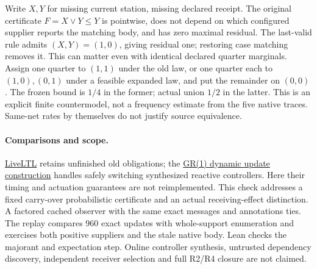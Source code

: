 \documentclass[11pt]{article}
\begin{document}
Write \(X,Y\) for missing current station, missing declared
receipt. The original certificate \(F=X\vee Y\le Y\) is
pointwise, does not depend on which configured supplier
reports the matching body, and has zero maximal residual.
The last-valid rule admits \((X,Y)=(1,0)\), giving residual
one; restoring case matching removes it. This can matter
even with identical declared quarter marginals. Assign
one quarter to \((1,1)\) under the old law, or one quarter
each to \((1,0),(0,1)\) under a feasible expanded law,
and put the remainder on \((0,0)\). The frozen bound is
\(1/4\) in the former; actual union \(1/2\) in the latter.
This is an explicit finite countermodel, not a frequency
estimate from the five native traces. Same-net rates by
themselves do not justify source equivalence.

\paragraph{Comparisons and scope.}
\href{https://arxiv.org/abs/2107.01136}{LiveLTL}
retains unfinished old obligations; the
\href{https://conf.researchr.org/details/icse-2022/icse-2022-papers/18/Dynamic-Update-for-Synthesized-GR-1-Controllers}{GR(1)
dynamic update construction} handles safely switching
synthesized reactive controllers. Here their timing and
actuation guarantees are not reimplemented. This check
addresses a fixed carry-over probabilistic certificate and
an actual receiving-effect distinction. A factored cached
observer with the same exact messages and annotations
ties. The replay compares 960 exact updates with
whole-support enumeration and exercises both positive
suppliers and the stale native body. Lean checks the
majorant and expectation step. Online controller synthesis,
untrusted dependency discovery, independent receiver
selection and full R2/R4 closure are not claimed.
\end{document}
